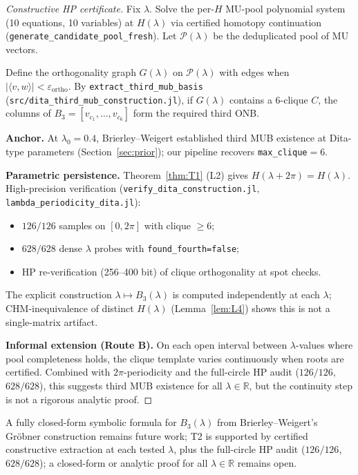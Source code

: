 \begin{proof}[Constructive HP certificate]
Fix $\lambda$.
Solve the per-$H$ MU-pool polynomial system (10 equations, 10 variables) at $H(\lambda)$
via certified homotopy continuation (\texttt{generate\_candidate\_pool\_fresh}).
Let $\mathcal{P}(\lambda)$ be the deduplicated pool of MU vectors.

Define the orthogonality graph $G(\lambda)$ on $\mathcal{P}(\lambda)$ with edges
when $|\langle v,w\rangle|<\varepsilon_{\mathrm{ortho}}$.
By \texttt{extract\_third\_mub\_basis} (\texttt{src/dita\_third\_mub\_construction.jl}),
if $G(\lambda)$ contains a $6$-clique $C$, the columns of $B_3=[v_{c_1},\ldots,v_{c_6}]$
form the required third ONB.

\textbf{Anchor.} At $\lambda_0=0.4$, Brierley--Weigert established third MUB existence at Dita-type parameters (Section~\ref{sec:prior}); our pipeline recovers \texttt{max\_clique}$=6$.

\textbf{Parametric persistence.} Theorem~\ref{thm:T1} (L2) gives
$H(\lambda+2\pi)=H(\lambda)$. High-precision verification
(\texttt{verify\_dita\_construction.jl}, \texttt{lambda\_periodicity\_dita.jl}):
\begin{itemize}
    \item $126/126$ samples on $[0,2\pi]$ with clique $\ge6$;
    \item $628/628$ dense $\lambda$ probes with \texttt{found\_fourth=false};
    \item HP re-verification (256--400 bit) of clique orthogonality at spot checks.
\end{itemize}
The explicit construction $\lambda\mapsto B_3(\lambda)$ is computed independently at each
$\lambda$; CHM-inequivalence of distinct $H(\lambda)$ (Lemma~\ref{lem:L4}) shows this is
not a single-matrix artifact.

\textbf{Informal extension (Route B).}
On each open interval between $\lambda$-values where pool completeness holds,
the clique template varies continuously when roots are certified.
Combined with $2\pi$-periodicity and the full-circle HP audit ($126/126$, $628/628$),
this suggests third MUB existence for all $\lambda\in\mathbb{R}$, but the continuity step is not a rigorous analytic proof.
\end{proof}

\begin{remark}
A fully closed-form symbolic formula for $B_3(\lambda)$ from Brierley--Weigert's
Gr\"obner construction remains future work; T2 is supported by certified constructive
extraction at each tested $\lambda$, plus the full-circle HP audit ($126/126$, $628/628$); a closed-form or analytic proof for all $\lambda\in\mathbb{R}$ remains open.
\end{remark}
